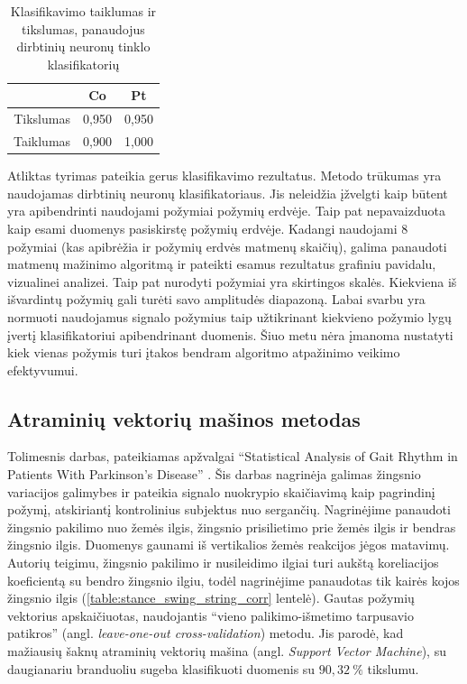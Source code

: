 \documentclass[]{vgtuef}
\begin{document}
\begin{table}
  \centering
  \renewcommand{\arraystretch}{1.3}
  \caption{Klasifikavimo taiklumas ir tikslumas, panaudojus dirbtinių neuronų tinklo klasifikatorių \cite{vgtu}}
  \label{table:vgtu_ann_scores}
  \begin{tabular}{|c|c|c|} \hline
    & Co & Pt \\ \hline
    Tikslumas & 0,950 & 0,950 \\ \hline
    Taiklumas & 0,900 & 1,000 \\ \hline
  \end{tabular}
\end{table}

Atliktas tyrimas pateikia gerus klasifikavimo rezultatus. Metodo trūkumas yra naudojamas dirbtinių neuronų klasifikatoriaus. Jis neleidžia įžvelgti kaip būtent yra apibendrinti naudojami požymiai požymių erdvėje. Taip pat nepavaizduota kaip esami duomenys pasiskirstę požymių erdvėje. Kadangi naudojami $8$ požymiai (kas apibrėžia ir požymių erdvės matmenų skaičių), galima panaudoti matmenų mažinimo algoritmą ir pateikti esamus rezultatus grafiniu pavidalu, vizualinei analizei. Taip pat nurodyti požymiai yra skirtingos skalės. Kiekviena iš išvardintų požymių gali turėti savo amplitudės diapazoną. Labai svarbu yra normuoti naudojamus signalo požymius taip užtikrinant kiekvieno požymio lygų įvertį klasifikatoriui apibendrinant duomenis. Šiuo metu nėra įmanoma nustatyti kiek vienas požymis turi įtakos bendram algoritmo atpažinimo veikimo efektyvumui.

\subsection{Atraminių vektorių mašinos metodas}


Tolimesnis darbas, pateikiamas apžvalgai ``Statistical Analysis of Gait Rhythm in Patients With Parkinson's Disease'' \cite{5280353}. Šis darbas nagrinėja galimas žingsnio variacijos galimybes ir pateikia signalo nuokrypio skaičiavimą kaip pagrindinį požymį, atskiriantį kontrolinius subjektus nuo sergančių. Nagrinėjime panaudoti žingsnio pakilimo nuo žemės ilgis, žingsnio prisilietimo prie žemės ilgis ir bendras žingsnio ilgis. Duomenys gaunami iš vertikalios žemės reakcijos jėgos matavimų. Autorių teigimu, žingsnio pakilimo ir nusileidimo ilgiai turi aukštą koreliacijos koeficientą su bendro žingsnio ilgiu, todėl nagrinėjime panaudotas tik kairės kojos žingsnio ilgis (\ref{table:stance_swing_string_corr} lentelė). Gautas požymių vektorius apskaičiuotas, naudojantis ``vieno palikimo-išmetimo tarpusavio patikros'' (angl. \textit{leave-one-out cross-validation}) metodu. Jis parodė, kad mažiausių šaknų atraminių vektorių mašina (angl. \textit{Support Vector Machine}), su daugianariu branduoliu sugeba klasifikuoti duomenis su $90,32~\%$ tikslumu. 
\end{document}
